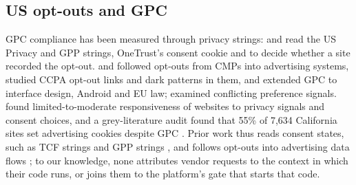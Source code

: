 \subsection*{US opt-outs and GPC}
GPC compliance has been measured through privacy strings: \citet{zimmeck2023gpc} and \citet{hausladen2025gpc} read the US Privacy and GPP strings, OneTrust's consent cookie and  to decide whether a site recorded the opt-out. \citet{liu2024opted} and \citet{aziz2024johnny} followed opt-outs from CMPs into advertising systems, \citet{tran2024ccpa,tran2025darkoptout} studied CCPA opt-out links and dark patterns in them, and \citet{zimmeck2024gapc,zimmeck2026android,zimmeck2026gpceu} extended GPC to interface design, Android and EU law; \citet{hils2021conflicting} examined conflicting preference signals. \citet{dawoud2026privaudit} found limited-to-moderate responsiveness of websites to privacy signals and consent choices, and a grey-literature audit found that 55\% of 7,634 California sites set advertising cookies despite GPC \citep{libert2026webxray}. Prior work thus reads consent states, such as TCF strings \citep{matte2020banners} and GPP strings \citep{hausladen2025gpc}, and follows opt-outs into advertising data flows \citep{liu2024opted,aziz2024johnny}; to our knowledge, none attributes vendor requests to the context in which their code runs, or joins them to the platform's gate that starts that code.

